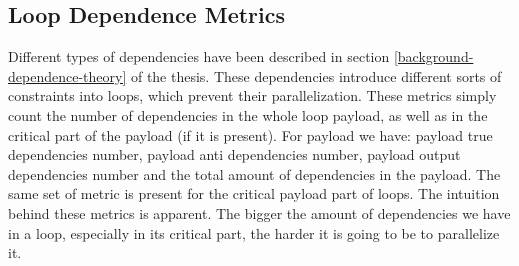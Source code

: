 \subsection{Loop Dependence Metrics}
\label{metrics-loop-dependence-metrics}
\qquad Different types of dependencies have been described in section \ref{background-dependence-theory} of the thesis. These dependencies introduce different sorts of constraints into loops, which prevent their parallelization.\newline
\null\qquad These metrics simply count the number of dependencies in the whole loop payload, as well as in the critical part of the payload (if it is present). For payload we have: payload true dependencies number, payload anti dependencies number, payload output dependencies number and the total amount of dependencies in the payload. The same set of metric is present for the critical payload part of loops.\newline
\null\qquad The intuition behind these metrics is apparent. The bigger the amount of dependencies we have in a loop, especially in its critical part, the harder it is going to be to parallelize it.


